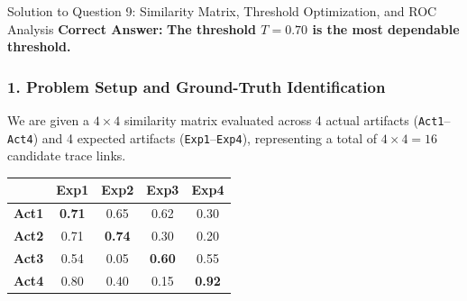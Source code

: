 \documentclass[11pt,a4paper]{article}
\begin{document}
\begin{solutionbox}{Solution to Question 9: Similarity Matrix, Threshold Optimization, and ROC Analysis}
\textbf{Correct Answer:} \textbf{The threshold $T = 0.70$ is the most dependable threshold.}

\subsubsection*{1. Problem Setup and Ground-Truth Identification}
We are given a $4 \times 4$ similarity matrix evaluated across 4 actual artifacts (\texttt{Act1}--\texttt{Act4}) and 4 expected artifacts (\texttt{Exp1}--\texttt{Exp4}), representing a total of $4 \times 4 = 16$ candidate trace links.
\begin{center}
\begin{tabular}{lcccc}
\toprule
 & \textbf{Exp1} & \textbf{Exp2} & \textbf{Exp3} & \textbf{Exp4} \\
\midrule
\textbf{Act1} & \cellcolor{highlightgreen}\textbf{0.71} & 0.65 & 0.62 & 0.30 \\
\textbf{Act2} & 0.71 & \cellcolor{highlightgreen}\textbf{0.74} & 0.30 & 0.20 \\
\textbf{Act3} & 0.54 & 0.05 & \cellcolor{highlightgreen}\textbf{0.60} & 0.55 \\
\textbf{Act4} & 0.80 & 0.40 & 0.15 & \cellcolor{highlightgreen}\textbf{0.92} \\
\bottomrule
\end{tabular}
\end{center}


\end{solutionbox}
\end{document}
